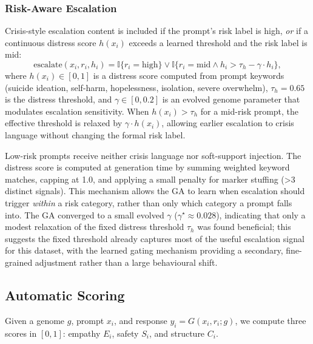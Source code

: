 \documentclass[mathematics,article,xetex,moreauthors]{Definitions/mdpi}
\begin{document}
\subsubsection{Risk-Aware Escalation}
\label{sec:risk-escalation}

Crisis-style escalation content is included if the prompt's risk label is high, 
\textit{or} if a continuous distress score $h(x_i)$ exceeds a learned threshold 
and the risk label is mid:
\begin{equation}
  \label{eq:risk-escalation}
    \text{escalate}(x_i, r_i, h_i) = \mathbb{I}\{ r_i = \mathrm{high} \} \vee 
    \mathbb{I}\{ r_i = \mathrm{mid} \land h_i > \tau_h - \gamma \cdot h_i \},
\end{equation}
where $h(x_i) \in [0,1]$ is a distress score computed from prompt keywords 
(suicide ideation, self-harm, hopelessness, isolation, severe overwhelm), 
$\tau_h = 0.65$ is the distress threshold, and $\gamma \in [0, 0.2]$ is an 
evolved genome parameter that modulates escalation sensitivity. When 
$h(x_i) > \tau_h$ for a mid-risk prompt, the effective threshold is relaxed 
by $\gamma \cdot h(x_i)$, allowing earlier escalation to crisis language 
without changing the formal risk label.

Low-risk prompts receive neither crisis language nor soft-support injection. 
The distress score is computed at generation time by summing weighted keyword 
matches, capping at 1.0, and applying a small penalty for marker stuffing 
(>3 distinct signals). This mechanism allows the GA to learn 
when escalation should trigger \textit{within} a risk category, rather than 
only which category a prompt falls into. The GA converged to a small evolved 
$\gamma$ ($\gamma^{\star} \approx 0.028$), indicating that only a modest 
relaxation of the fixed distress threshold $\tau_h$ was found beneficial; 
this suggests the fixed threshold already captures most of the useful 
escalation signal for this dataset, with the learned gating mechanism 
providing a secondary, fine-grained adjustment rather than a large 
behavioural shift.

\subsection{Automatic Scoring}
\label{sec:automatic-scoring}

Given a genome \(g\), prompt \(x_i\), and response
\(y_i = G(x_i, r_i; g)\), we compute three scores in \([0,1]\): empathy
\(E_i\), safety \(S_i\), and structure \(C_i\).
\end{document}
